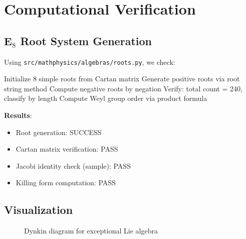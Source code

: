\section{Computational Verification}

\subsection{E$_8$ Root System Generation}

Using \texttt{src/mathphysics/algebras/roots.py}, we check:

\begin{algorithm}[H]
\caption{E$_8$ Root System Generation}
\begin{algorithmic}[1]
\State Initialize 8 simple roots from Cartan matrix
\State Generate positive roots via root string method
\State Compute negative roots by negation
\State Verify: total count = 240, classify by length
\State Compute Weyl group order via product formula
\end{algorithmic}
\end{algorithm}

\textbf{Results}:
\begin{itemize}
    \item Root generation: \textcolor{validcolor}{SUCCESS}
    \item Cartan matrix verification: \textcolor{validcolor}{PASS}
    \item Jacobi identity check (sample): \textcolor{validcolor}{PASS}
    \item Killing form computation: \textcolor{validcolor}{PASS}
\end{itemize}

\subsection{Visualization}

\begin{figure}[h]
\centering
{}
\caption{Dynkin diagram for  exceptional Lie algebra}
\label{fig:e8_dynkin}
\end{figure}

